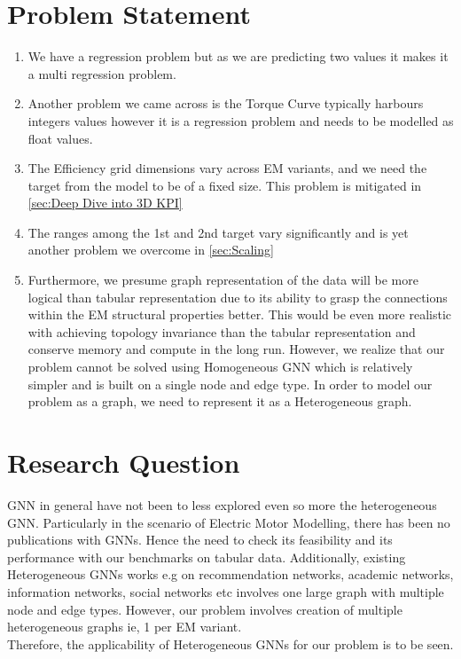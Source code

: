 \documentclass{report} %
\begin{document}
\section{Problem Statement}\label{sec:Problem Statement}

\begin{enumerate}

    \item We have a regression problem but as we are predicting two values it makes it a multi regression problem. 
    \item Another problem we came across is the Torque Curve typically harbours integers values however it is a regression problem and needs to be modelled as float values. 
    \item The Efficiency grid dimensions vary across \ac{EM} variants, and we need the target from the model to be of a fixed size. This problem is mitigated in \ref{sec:Deep Dive into 3D KPI}
    \item The ranges among the 1st and 2nd target vary significantly and is yet another problem we overcome in \ref{sec:Scaling}
    \item Furthermore, we presume graph representation of the data will be more logical than tabular representation due to its ability to grasp the connections within the \ac{EM} structural properties better.
    This would be even more realistic with achieving topology invariance than the tabular representation and conserve memory and compute in the long run.
    However, we realize that our problem cannot be solved using Homogeneous \ac{GNN} which is relatively simpler and is built on a single node and edge type.
    In order to model our problem as a graph, we need to represent it as a Heterogeneous graph. \\

\end{enumerate}

\section{Research Question}\label{sec:Research Question}
\ac{GNN} in general have not been to less explored even so more the heterogeneous \ac{GNN}.
Particularly in the scenario of Electric Motor Modelling, there has been no publications with \ac{GNN}s.
Hence the need to check its feasibility and its performance with our benchmarks on tabular data.
Additionally, existing Heterogeneous \ac{GNN}s works e.g on recommendation networks, academic networks, information networks, social networks etc involves one large graph with multiple node and edge types. 
However, our problem involves creation of multiple heterogeneous graphs ie, 1 per \ac{EM} variant.\\
Therefore, the applicability of Heterogeneous \ac{GNN}s for our problem is to be seen.\\
\end{document}
